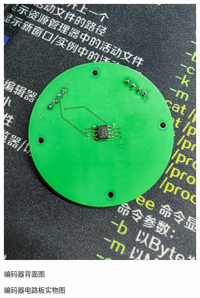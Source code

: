 ﻿\documentclass[12pt,a4paper]{article}
\begin{document}
\begin{figure}[htbp]
\begin{minipage}{0.3\linewidth}
    \includegraphics[width=\linewidth]{picture/编码器2.png}
    \caption{编码器背面图}
  \end{minipage} 	%
  \caption{编码器电路板实物图}
  \label{cibian}%
\end{figure}

\clearpage

\newpage
\end{document}
